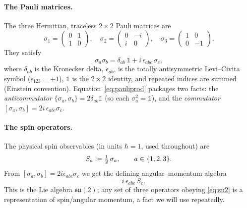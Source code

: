 \documentclass[11pt,oneside]{article}
\newcommand{\halff}{\tfrac{1}{2}}
\newcommand{\id}{\mathbb{1}}
\newcommand{\eqdef}{\vcentcolon=}
\begin{document}
\paragraph{The Pauli matrices.}
The three Hermitian, traceless $2\times2$ Pauli matrices are
\begin{equation}
  \sigma_1 = \begin{pmatrix} 0 & 1 \\ 1 & 0 \end{pmatrix}, \quad
  \sigma_2 = \begin{pmatrix} 0 & -i \\ i & 0 \end{pmatrix}, \quad
  \sigma_3 = \begin{pmatrix} 1 & 0 \\ 0 & -1 \end{pmatrix}.
\end{equation}
They satisfy
\begin{equation}
  \sigma_a\sigma_b = \delta_{ab}\,\id + i\,\epsilon_{abc}\,\sigma_c ,
  \label{eq:pauliprod}
\end{equation}
where $\delta_{ab}$ is the Kronecker delta, $\epsilon_{abc}$ is the totally
antisymmetric Levi--Civita symbol ($\epsilon_{123}=+1$), $\id$ is the
$2\times2$ identity, and repeated indices are summed (Einstein convention).
Equation~\eqref{eq:pauliprod} packages two facts: the \emph{anticommutator}
$\{\sigma_a,\sigma_b\} = 2\delta_{ab}\id$ (so each $\sigma_a^2=\id$), and the
\emph{commutator} $[\sigma_a,\sigma_b] = 2i\,\epsilon_{abc}\sigma_c$.

\paragraph{The spin operators.}
The physical spin observables (in units $\hbar=1$, used throughout) are
\begin{equation}
  S_a \eqdef \halff\,\sigma_a, \qquad a\in\{1,2,3\}.
\end{equation}
From $[\sigma_a,\sigma_b]=2i\epsilon_{abc}\sigma_c$ we get the defining
angular--momentum algebra
\begin{equation}
  [S_a, S_b] = i\,\epsilon_{abc}\,S_c .
  \label{eq:su2}
\end{equation}
This is the Lie algebra $\mathfrak{su}(2)$; any set of three operators obeying
\eqref{eq:su2} is a representation of spin/angular momentum, a fact we will use
repeatedly.
\end{document}
